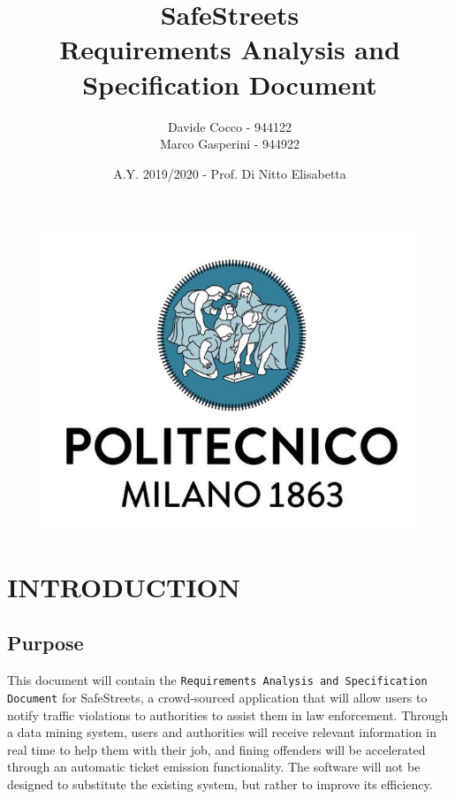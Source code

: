 \documentclass[12pt,a4paper]{article}
\author{Davide Cocco - 944122\\
	Marco Gasperini - 944922}
\date{A.Y. 2019/2020 - Prof. Di Nitto Elisabetta}
\title{
	\textbf{\Huge{SafeStreets}} \\
	\large Requirements Analysis and Specification Document
}
\begin{document}
	\begin{figure}
		\centering
		\includegraphics[width=1.0\linewidth]{Images/polimi.jpg}
	\end{figure}

	\maketitle
	\newpage
	\tableofcontents
	\newpage

\section{INTRODUCTION}
\subsection{Purpose} 
This document will contain the \texttt{Requirements Analysis and Specification Document} for SafeStreets, a crowd-sourced application that will allow users to notify traffic violations to authorities to assist them in law enforcement. Through a data mining system, users and authorities will receive relevant information in real time to help them with their job, and fining offenders will be accelerated through an automatic ticket emission functionality. The software will not be designed to substitute the existing system, but rather to improve its efficiency.
 
\end{document}
